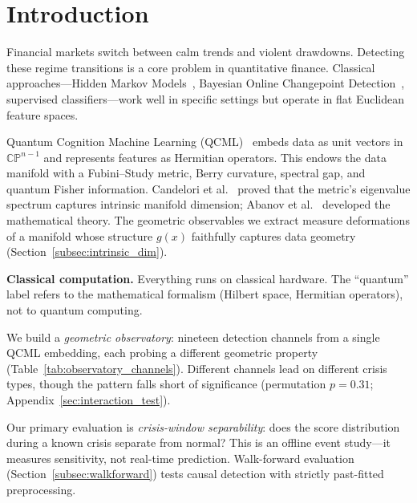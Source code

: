\documentclass[3p]{elsarticle}
\newcommand{\CP}{\mathbb{CP}}
\begin{document}

\section{Introduction}\label{sec:intro}

Financial markets switch between calm trends and violent drawdowns.
Detecting these regime transitions is a core problem in quantitative
finance.  Classical approaches---Hidden Markov
Models~\cite{hamilton1989,ang_bekaert2002}, Bayesian Online Changepoint
Detection~\cite{adams_mackay2007}, supervised classifiers---work well in
specific settings but operate in flat Euclidean feature spaces.

Quantum Cognition Machine Learning
(QCML)~\cite{candelori2025} embeds data as unit vectors in
$\CP^{n-1}$ and represents features as Hermitian operators.  This
endows the data manifold with a Fubini--Study metric, Berry curvature,
spectral gap, and quantum Fisher information.  Candelori et
al.~\cite{candelori2025} proved that the metric's eigenvalue spectrum
captures intrinsic manifold dimension; Abanov et
al.~\cite{abanov2025} developed the mathematical theory.  The
geometric observables we extract measure deformations of a manifold
whose structure $g(x)$ faithfully captures data geometry
(Section~\ref{subsec:intrinsic_dim}).

\smallskip\noindent\textbf{Classical computation.}
Everything runs on classical hardware.  The ``quantum'' label refers
to the mathematical formalism (Hilbert space, Hermitian operators),
not to quantum computing.

We build a \emph{geometric observatory}: nineteen detection channels
from a single QCML embedding, each probing a different geometric
property (Table~\ref{tab:observatory_channels}).  Different channels
lead on different crisis types, though the pattern falls short of
significance (permutation $p = 0.31$;
Appendix~\ref{sec:interaction_test}).

Our primary evaluation is \emph{crisis-window separability}: does the
score distribution during a known crisis separate from normal?  This
is an offline event study---it measures sensitivity, not real-time
prediction.  Walk-forward evaluation
(Section~\ref{subsec:walkforward}) tests causal detection with
strictly past-fitted preprocessing.
\end{document}
